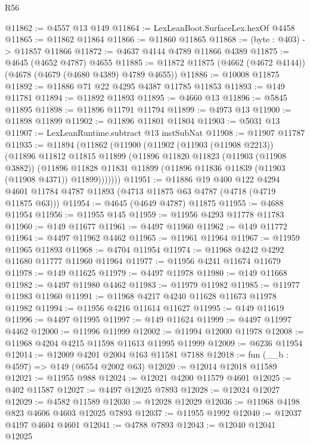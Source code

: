 \begin{lexlean}{R56}
\begin{coremodule}
@11862 := @4557 @13 @149
@11864 := LexLeanBoot.SurfaceLex.hexOf @4458
@11865 := @11862 @11864
@11866 := @11860 @11865
@11868 := (byte : @403) -> @11857 @11866
@11872 := @4637 @4144 @4789 @11866 @4389
@11875 := @4645 (@4652 @4787) @4655
@11885 := @11872 @11875 (@4662 (@4672 @4144)) (@4678 (@4679 (@4680 @4389) @4789 @4655))
@11886 := @10008 @11875
@11892 := @11886 @71 @22 @4295 @4387 @11785 @11853
@11893 := @149 @11781
@11894 := @11892 @11893
@11895 := @4660 @13
@11896 := @5845 @11895
@11898 := @11896 @11791 @11794
@11899 := @4973 @13
@11900 := @11898 @11899
@11902 := @11896 @11801 @11804
@11903 := @5031 @13
@11907 := LexLeanRuntime.subtract @13 instSubNat
@11908 := @11907 @11787
@11935 := @11894
    (@11862
      (@11900
        (@11902
          (@11903 (@11908 @2213))
          (@11896
            @11812
            @11815
            @11899
            (@11896
              @11820
              @11823
              (@11903 (@11908 @3882))
              (@11896
                @11828
                @11831
                @11899
                (@11896 @11836 @11839 (@11903 (@11908 @4371)) @11899)))))))
@11951 := @11886
    @19
    @400
    @122
    @4294
    @4601
    @11784
    @4787
    @11893
    (@4713 @11875 @63 @4787 (@4718 (@4719 @11875 @63)))
@11954 := @4645 (@4649 @4787) @11875
@11955 := @4688 @11954
@11956 := @11955 @145
@11959 := @11956 @4293 @11778 @11783
@11960 := @149 @11677
@11961 := @4497 @11960
@11962 := @149 @11772
@11964 := @4497 @11962 @4462
@11965 := @11961 @11964
@11967 := @11959 @11965 @11893
@11968 := @4704 @11954
@11974 := @11968 @4242 @4292 @11680 @11777 @11960 @11964
@11977 := @11956 @4241 @11674 @11679
@11978 := @149 @11625
@11979 := @4497 @11978
@11980 := @149 @11668
@11982 := @4497 @11980 @4462
@11983 := @11979 @11982
@11985 := @11977 @11983 @11960
@11991 := @11968 @4217 @4240 @11628 @11673 @11978 @11982
@11994 := @11956 @4216 @11614 @11627
@11995 := @149 @11619
@11996 := @4497 @11995
@11997 := @149 @11624
@11999 := @4497 @11997 @4462
@12000 := @11996 @11999
@12002 := @11994 @12000 @11978
@12008 := @11968 @4204 @4215 @11598 @11613 @11995 @11999
@12009 := @6236 @11954
@12014 := @12009 @4201 @2004 @163 @11581 @7188
@12018 := fun (__b : @4597) => @149 (@6554 @2002 @63)
@12020 := @12014 @12018 @11589
@12021 := @11955 @988
@12024 := @12021 @4200 @11579 @4601
@12025 := @402 @11587
@12027 := @4497 @12025 @7893
@12028 := @12024 @12027
@12029 := @4582 @11589
@12030 := @12028 @12029
@12036 := @11968 @4198 @823 @4606 @4603 @12025 @7893
@12037 := @11955 @1992
@12040 := @12037 @4197 @4604 @4601
@12041 := @4788 @7893
@12043 := @12040 @12041 @12025

\end{coremodule}
\end{lexlean}
